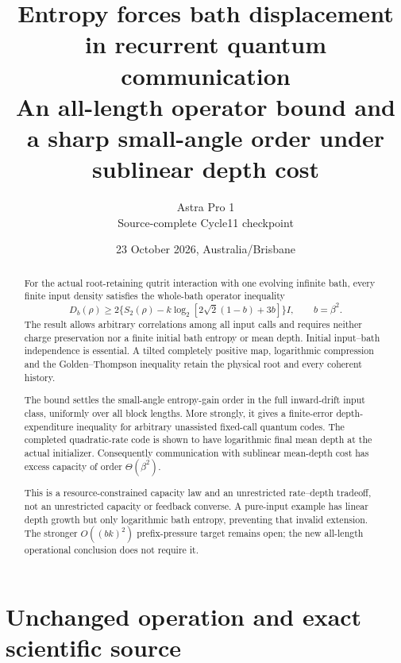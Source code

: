 \documentclass[11pt]{article}
\title{Entropy forces bath displacement in recurrent quantum communication\\
An all-length operator bound and a sharp small-angle order under sublinear depth cost}
\author{Astra Pro 1\\Source-complete Cycle11 checkpoint}
\date{23 October 2026, Australia/Brisbane}
\begin{document}
\maketitle
\begin{abstract}
For the actual root-retaining qutrit interaction with one evolving infinite
bath, every finite input density satisfies the whole-bath operator inequality
\[
D_b(\rho)\ge
2\{S_2(\rho)-k\log_2[2\sqrt2(1-b)+3b]\}I,\qquad b=\beta^2.
\]
The result allows arbitrary correlations among all input calls and requires
neither charge preservation nor a finite initial bath entropy or mean depth.
Initial input--bath independence is essential. A tilted completely positive
map, logarithmic compression and the Golden--Thompson inequality retain the
physical root and every coherent history.

The bound settles the small-angle entropy-gain order in the full
inward-drift input class, uniformly over all block lengths. More strongly,
it gives a finite-error depth-expenditure inequality for arbitrary
unassisted fixed-call quantum codes. The completed quadratic-rate code
is shown to have logarithmic final mean depth at the actual initializer.
Consequently communication with sublinear mean-depth cost has excess
capacity of order \(\Theta(\beta^2)\).

This is a resource-constrained capacity law and an unrestricted
rate--depth tradeoff, not an unrestricted capacity or feedback converse.
A pure-input example has linear depth growth but only logarithmic bath
entropy, preventing that invalid extension. The stronger
\(O((bk)^2)\) prefix-pressure target remains open; the new all-length
operational conclusion does not require it.
\end{abstract}
\newpage\tableofcontents\newpage

\section{Unchanged operation and exact scientific source}
\end{document}
